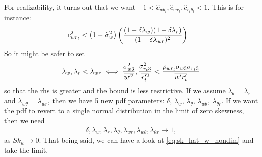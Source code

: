 For realizability, it turns out that we want
$-1 < \widehat{c}_{w \theta_l}, \widehat{c}_{w r_t}, \widehat{c}_{r_t \theta_l} < 1$.
This is for instance:
\begin{align}
    c_{w r_t}^2 &< \left( 1 - \tilde{\sigma}_w^2 \right) \left(
    \frac{(1-\delta \lambda_w)(1-\delta \lambda_r)}{(1-\delta \lambda_{w r})^2}
    \right)
\end{align}
So it might be safer to set
\begin{align}
    \label{eq:lambda_corr_ineq}
    \lambda_w , \lambda_r < \lambda_{w r}
    \iff
    \frac{\sigma_{w 3}^2}{\overline{w'^2}}, \frac{\sigma_{r_t 3}^2}{\overline{r_t'^2}} <
    \frac{\rho_{w r_t} \sigma_{w 3} \sigma_{r_t 3}}{\overline{w' r_t'}}
\end{align}
so that the \gls{rhs} is greater and the bound is less restrictive.
If we assume $\lambda_\theta = \lambda_r$ and $\lambda_{w\theta} = \lambda_{wr}$,
then we have 5 new \gls{pdf} parameters:
$\delta$, $\lambda_w$, $\lambda_\theta$, $\lambda_{w \theta}$, $\lambda_{\theta r}$.
If we want the \gls{pdf} to revert to a single normal distribution in the limit of zero skewness,
then we need
\begin{align}
    \delta, \lambda_w, \lambda_r, \lambda_\theta,
    \lambda_{w r}, \lambda_{w \theta}, \lambda_{\theta r}
    \to 1,
\end{align}
as $Sk_w \to 0$.
That being said, we can have a look at \cref{eq:sk_hat_w_nondim} and take the limit.

